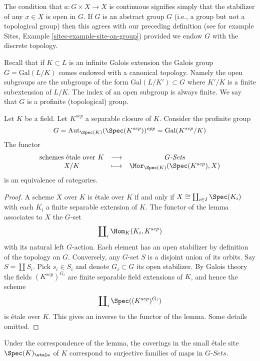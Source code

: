 \noindent
The condition that $a : G \times X \to X$ is continuous signifies
simply that the stabilizer of any  $x \in X$ is open in $G$.
If $G$ is an abstract group $G$ (i.e., a group but not a topological group)
then this agrees with our preceding definition (see for example
Sites, Example \ref{sites-example-site-on-group})
provided we endow $G$ with the discrete topology.

\medskip\noindent
Recall that if $K \subset L$ is an infinite Galois extension the
Galois group $G = \text{Gal}(L/K)$ comes endowed with a canonical
topology. Namely the open subgroups are the subgroups of the form
$\text{Gal}(L/K') \subset G$ where $K'/K$ is a finite subextension of $L/K$.
The index of an open subgroup is always finite.
We say that $G$ is a profinite (topological) group.

\begin{lemma}
\label{lemma-sheaves-point}
Let $K$ be a field.
Let $K^{sep}$ a separable closure of $K$.
Consider the profinite group
$$
G = \text{Aut}_{\Spec(K)}(\Spec(K^{sep}))^{opp} =
\text{Gal}(K^{sep}/K)
$$
The functor
$$
\begin{matrix}
\text{schemes \'etale over }K &
\longrightarrow &
G\textit{-Sets} \\
X/K & \longmapsto &
\Mor_{\Spec(K)}(\Spec(K^{sep}), X)
\end{matrix}
$$
is an equivalence of categories.
\end{lemma}

\begin{proof}
A scheme $X$ over $K$ is \'etale over $K$ if and only if
$X \cong \coprod_{i\in I} \Spec(K_i)$ with
each $K_i$ a finite separable extension of $K$.
The functor of the lemma associates to $X$ the $G$-set
$$
\coprod\nolimits_i \Hom_K(K_i, K^{sep})
$$
with its natural left $G$-action. Each element has an open stabilizer
by definition of the topology on $G$. Conversely, any $G$-set $S$
is a disjoint union of its orbits. Say $S = \coprod S_i$. Pick $s_i \in S_i$
and denote $G_i \subset G$ its open stabilizer. By Galois theory the fields
$(K^{sep})^{G_i}$ are finite separable field extensions of $K$, and
hence the scheme
$$
\coprod\nolimits_i \Spec((K^{sep})^{G_i})
$$
is \'etale over $K$. This gives an inverse to the functor of the lemma.
Some details omitted.
\end{proof}

\begin{remark}
\label{remark-covering-surjective}
Under the correspondence of the lemma, the coverings in the small \'etale site
$\Spec(K)_\etale$ of $K$ correspond to surjective families of
maps in $G\textit{-Sets}$.
\end{remark}







